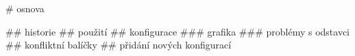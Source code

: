 # osnova

## historie
## použití
## konfigurace
### grafika
### problémy s odstavci
## konfliktní balíčky
## přidání nových konfigurací
